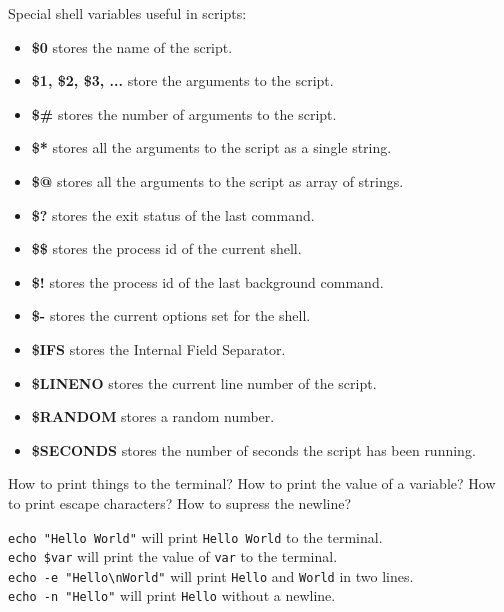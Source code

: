 \begin{ans}
  Special shell variables useful in scripts:
  \begin{itemize}
    \item \textbf{\$0} stores the name of the script.
    \item \textbf{\$1, \$2, \$3, ...} store the arguments to the script.
    \item \textbf{\$\#} stores the number of arguments to the script.
    \item \textbf{\$*} stores all the arguments to the script as a single string.
    \item \textbf{\$@} stores all the arguments to the script as array of strings.
    \item \textbf{\$?} stores the exit status of the last command.
    \item \textbf{\$\$} stores the process id of the current shell.
    \item \textbf{\$!} stores the process id of the last background command.
    \item \textbf{\$-} stores the current options set for the shell.
    \item \textbf{\$IFS} stores the Internal Field Separator.
    \item \textbf{\$LINENO} stores the current line number of the script.
    \item \textbf{\$RANDOM} stores a random number.
    \item \textbf{\$SECONDS} stores the number of seconds the script has been running.
  \end{itemize}
\end{ans}


\begin{qs}
  How to print things to the terminal? How to print the value of a variable?
  How to print escape characters? How to supress the newline?
\end{qs}

\begin{ans}
  \texttt{echo "Hello World"} will print \texttt{Hello World} to the terminal. \\
  \texttt{echo \$var} will print the value of \texttt{var} to the terminal. \\
  \texttt{echo -e "Hello\textbackslash nWorld"} will print \texttt{Hello} and \texttt{World} in two lines. \\
  \texttt{echo -n "Hello"} will print \texttt{Hello} without a newline.
\end{ans}

